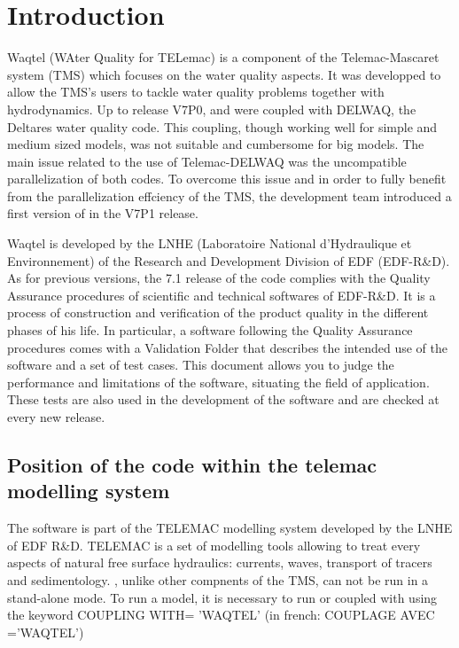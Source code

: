 \chapter{Introduction}

Waqtel (WAter Quality for TELemac) is a component of the Telemac-Mascaret system (TMS) which focuses on the water quality 
aspects. It was developped to allow the TMS's users to tackle water quality problems together with hydrodynamics.\newline
Up to release V7P0,  and  were coupled with DELWAQ, the Deltares water quality code. This coupling,
though working well for simple and medium sized models, was not suitable and cumbersome for big models. The main issue 
related to the use of Telemac-DELWAQ was the uncompatible parallelization of both codes. \newline
To overcome this issue and in order to fully benefit from the parallelization effciency of the TMS, the development team
introduced a first version of \waqtel in the V7P1 release. 

Waqtel is developed by the LNHE (Laboratoire National d'Hydraulique et
Environnement) of the Research and Development Division of EDF (EDF-R\&D). As
for previous versions, the 7.1 release of the code complies with the Quality
Assurance procedures of scientific and technical softwares of EDF-R\&D. It is a
process of construction and verification of the product quality in the
different phases of his life. In particular, a software following the Quality
Assurance procedures comes with a Validation Folder that describes the intended
use of the software and a set of test cases. This document allows you to judge
the performance and limitations of the software, situating the field of
application. These tests are also used in the development of the software and are
checked at every new release.

\section{Position of the  code within the telemac modelling system}

The \waqtel software is part of the TELEMAC modelling system developed by
the LNHE of EDF R\&D. TELEMAC is a set of modelling tools allowing to treat
every aspects of natural free surface hydraulics: currents, waves, transport of
tracers and sedimentology.
\newline
\waqtel, unlike other compnents of the TMS, can not be run in a stand-alone mode.
To run a \waqtel model, it is necessary to run  or  coupled 
with \waqtel using the keyword COUPLING WITH= 'WAQTEL' (in french: COUPLAGE AVEC ='WAQTEL')

